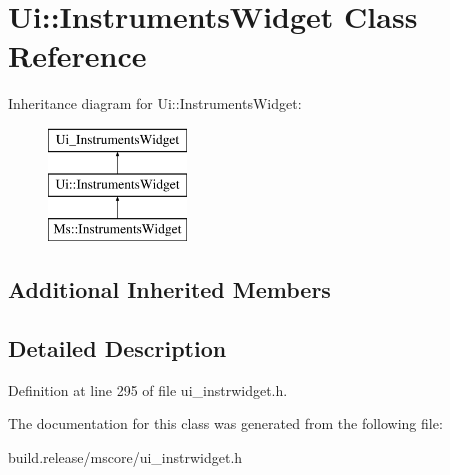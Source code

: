 \hypertarget{class_ui_1_1_instruments_widget}{}\section{Ui\+:\+:Instruments\+Widget Class Reference}
\label{class_ui_1_1_instruments_widget}
Inheritance diagram for Ui\+:\+:Instruments\+Widget\+:\begin{figure}[H]
\begin{center}
\leavevmode
\includegraphics[height=3.000000cm]{class_ui_1_1_instruments_widget}
\end{center}
\end{figure}
\subsection*{Additional Inherited Members}


\subsection{Detailed Description}


Definition at line 295 of file ui\+\_\+instrwidget.\+h.



The documentation for this class was generated from the following file\+:\begin{DoxyCompactItemize}
\item 
build.\+release/mscore/ui\+\_\+instrwidget.\+h\end{DoxyCompactItemize}
